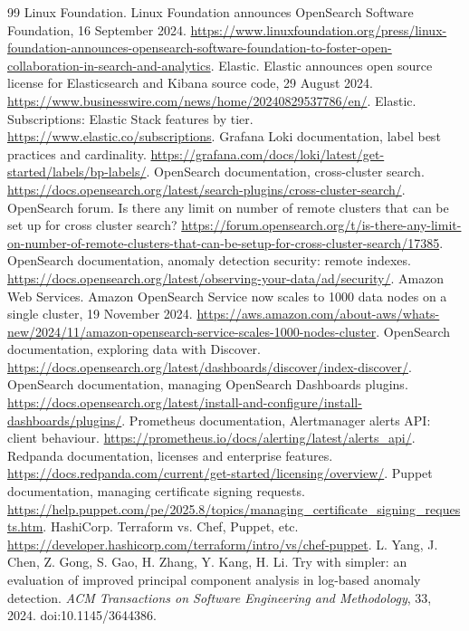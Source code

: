 {\begin{thebibliography}{99}
 Linux Foundation. Linux Foundation announces OpenSearch Software Foundation, 16 September 2024. \url{https://www.linuxfoundation.org/press/linux-foundation-announces-opensearch-software-foundation-to-foster-open-collaboration-in-search-and-analytics}.
 Elastic. Elastic announces open source license for Elasticsearch and Kibana source code, 29 August 2024. \url{https://www.businesswire.com/news/home/20240829537786/en/}.
 Elastic. Subscriptions: Elastic Stack features by tier. \url{https://www.elastic.co/subscriptions}.
 Grafana Loki documentation, label best practices and cardinality. \url{https://grafana.com/docs/loki/latest/get-started/labels/bp-labels/}.
 OpenSearch documentation, cross-cluster search. \url{https://docs.opensearch.org/latest/search-plugins/cross-cluster-search/}.
 OpenSearch forum. Is there any limit on number of remote clusters that can be set up for cross cluster search? \url{https://forum.opensearch.org/t/is-there-any-limit-on-number-of-remote-clusters-that-can-be-setup-for-cross-cluster-search/17385}.
 OpenSearch documentation, anomaly detection security: remote indexes. \url{https://docs.opensearch.org/latest/observing-your-data/ad/security/}.
 Amazon Web Services. Amazon OpenSearch Service now scales to 1000 data nodes on a single cluster, 19 November 2024. \url{https://aws.amazon.com/about-aws/whats-new/2024/11/amazon-opensearch-service-scales-1000-nodes-cluster}.
 OpenSearch documentation, exploring data with Discover. \url{https://docs.opensearch.org/latest/dashboards/discover/index-discover/}.
 OpenSearch documentation, managing OpenSearch Dashboards plugins. \url{https://docs.opensearch.org/latest/install-and-configure/install-dashboards/plugins/}.
 Prometheus documentation, Alertmanager alerts API: client behaviour. \url{https://prometheus.io/docs/alerting/latest/alerts_api/}.
 Redpanda documentation, licenses and enterprise features. \url{https://docs.redpanda.com/current/get-started/licensing/overview/}.
 Puppet documentation, managing certificate signing requests. \url{https://help.puppet.com/pe/2025.8/topics/managing_certificate_signing_requests.htm}.
 HashiCorp. Terraform vs. Chef, Puppet, etc. \url{https://developer.hashicorp.com/terraform/intro/vs/chef-puppet}.
 L. Yang, J. Chen, Z. Gong, S. Gao, H. Zhang, Y. Kang, H. Li. Try with simpler: an evaluation of improved principal component analysis in log-based anomaly detection. \emph{ACM Transactions on Software Engineering and Methodology}, 33, 2024. doi:10.1145/3644386.
\end{thebibliography}
}
